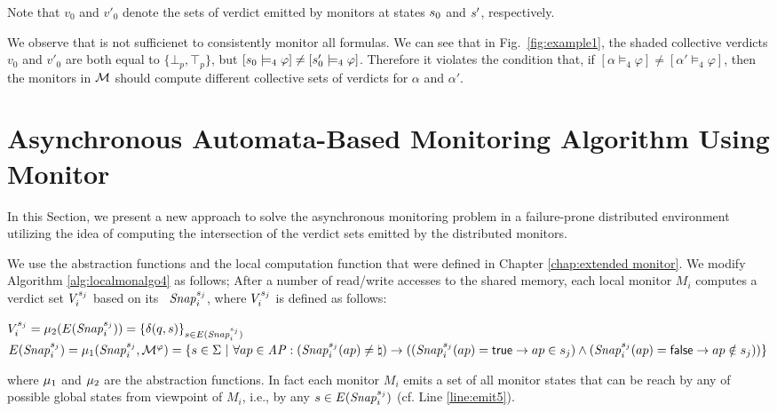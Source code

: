 


Note that $v_0$ and $v'_0$ denote the sets of verdict emitted by monitors at states $s_0$ and $s'$, respectively. 


We observe that \LTLfour is not sufficienet to consistently monitor all \LTL 
formulas. We can see that in Fig.~\ref{fig:example1}, the shaded 
collective verdicts $v_0$ and $v'_0$ are both equal to $\{\bot_p, \top_p\}$, 
but $[s_0 \models_4 \varphi] \neq [s'_0 \models_4 \varphi]$. Therefore it violates the condition that, if $[\alpha \models_4 \varphi] \neq [\alpha' \models_4 \varphi] $, then the monitors in $\mathcal{M}$ should compute different collective sets of verdicts for $\alpha$ and $\alpha'$.  












\section{Asynchronous Automata-Based Monitoring Algorithm Using \LTLtri Monitor}
\label{sec:AMAltl3}



In this Section, we present a new approach to solve the asynchronous monitoring problem in a failure-prone distributed environment utilizing the idea of computing the intersection of the verdict sets emitted by the distributed monitors.

We use the abstraction functions and the local computation function that were defined in Chapter \ref{chap:extended monitor}. We modify Algorithm \ref{alg:localmonalgo4} as follows; After a number of read/write accesses to the shared memory, each local monitor $M_i$ computes a verdict set $V_i^{s_j}$ based on its \localreg~$\mathit{Snap}_i^{s_j}$, where $V_i^{s_j}$ is defined as follows:


\begin{center}

                $V_i^{s_j}= \mu_2(E(\mathit{Snap}_i^{s_j})) = \{\delta(q, s)\}_{s \in E(\mathit{Snap}_i^{s_j})} $ \\
                $  E(\mathit{Snap}_i^{s_j}) = \mu_1(\mathit{Snap}_i^{s_j}, \mathcal{M}^\varphi) = \{ s \in \Sigma ~|~ \forall ap \in \mathit{AP}: (\mathit{Snap}_i^{s_j}(ap) \neq \natural) \rightarrow ( (\mathit{Snap}_i^{s_j}(ap) = \mathsf{true} \rightarrow ap \in s_j) \wedge  (\mathit{Snap}_i^{s_j}(ap) = \mathsf{false} \rightarrow ap \notin s_j) ) \} $
\end{center}
where $\mu_1$ and $\mu_2$ are the abstraction functions. In fact each monitor $M_i$ emits a set of all monitor states that can be reach by any of possible global states from viewpoint of $M_i$, i.e., by any $s \in E(\mathit{Snap}_i^{s_j})$ (cf. Line \ref{line:emit5}).\\



